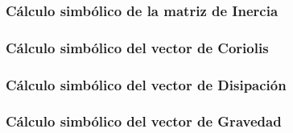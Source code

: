 \subsubsection{Cálculo simbólico de la matriz de Inercia} \label{cd:inercia}
    

\subsubsection{Cálculo simbólico del vector de Coriolis} \label{cd:coriolis}
    

\subsubsection{Cálculo simbólico del vector de Disipación} \label{cd:disipacion}
    

\subsubsection{Cálculo simbólico del vector de Gravedad} \label{cd:gravedad}
    